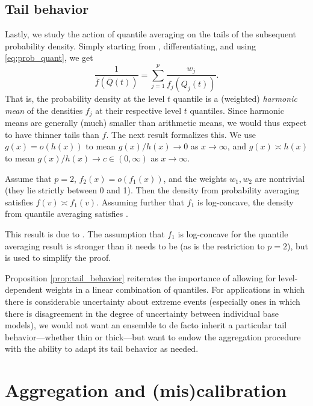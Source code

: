 \documentclass{article}
\begin{document}
\subsection{Tail behavior}

Lastly, we study the action of quantile averaging on the tails of the subsequent
probability density. Simply starting from , differentiating, and using \eqref{eq:prob_quant}, we get
\[
\frac{1}{\bar{f}(\bar{Q}(t))} = \sum_{j=1}^p \frac{w_j}{f_j(Q_j(t))}. 
\]
That is, the probability density  at the level $t$ quantile is
a (weighted) \emph{harmonic mean} of the densities $f_j$ at their respective
level $t$ quantiles. Since harmonic means are generally (much) smaller than
arithmetic means, we would thus expect  to have thinner tails
than $f$. The next result formalizes this. We use $g(x) = o(h(x))$ to mean
$g(x)/h(x) \to 0$ as $x \to \infty$, and $g(x) \asymp h(x)$ to mean $g(x)/h(x)
\to c \in (0, \infty)$ as $x \to \infty$.

\begin{proposition}
\label{prop:tail_behavior}
Assume that $p=2$, $f_2(x) = o(f_1(x))$, and the weights $w_1,w_2$ are
nontrivial (they lie strictly between 0 and 1). Then the density from
probability averaging satisfies $f(v) \asymp f_1(v)$. Assuming further that
$f_1$ is log-concave, the density from quantile averaging satisfies
.  
\end{proposition}

This result is due to \citet{fakoor2021flexible}. The assumption that $f_1$ is
log-concave for the quantile averaging result is stronger than it needs to be
(as is the restriction to $p=2$), but is used to simplify the proof. 

Proposition \ref{prop:tail_behavior} reiterates the importance of allowing for
level-dependent weights in a linear combination of quantiles. For applications
in which there is considerable uncertainty about extreme events (especially ones
in which there is disagreement in the degree of uncertainty between individual
base models), we would not want an ensemble to de facto inherit a particular
tail behavior---whether thin or thick---but want to endow the aggregation
procedure with the ability to adapt its tail behavior as needed.

\section{Aggregation and (mis)calibration}
\label{sec:aggr_calib}
\end{document}
